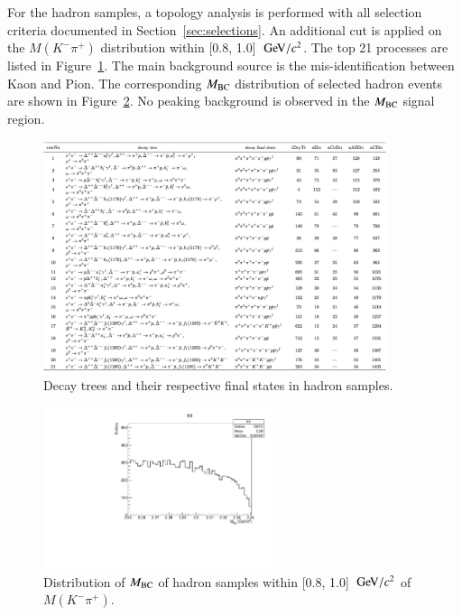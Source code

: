 For the hadron samples, a topology analysis is performed with all selection criteria documented in Section~\ref{sec:selections}. An additional cut is applied on the $M(K^-\pi^+)$ distribution within [0.8, 1.0] $\gev/c^2$. The top 21 processes are listed in Figure~\ref{fig:topo_hadron}. The main background source is the mis-identification between Kaon and Pion. The corresponding $M_{\rm{BC}}$ distribution of selected hadron events are shown in Figure~\ref{fig:mbc_hadron}. No peaking background is observed in the $M_{\rm{BC}}$ signal region.

\begin{figure}[h]\centering
    \includegraphics[width=0.90\textwidth]{figure/app_bkg/topo.png}
    \caption{Decay trees and their respective final states in hadron samples.}
\label{fig:topo_hadron} 
\end{figure}

\begin{figure}[h]\centering
    \includegraphics[width=0.60\textwidth]{figure/app_bkg/mbc_hadron.pdf}
    \caption{Distribution of $M_{\rm{BC}}$ of hadron samples within [0.8, 1.0] $\gev/c^2$ of $M(K^-\pi^+)$.}
\label{fig:mbc_hadron} 
\end{figure}
